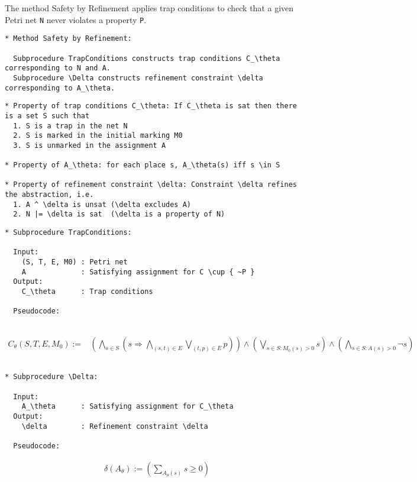 The method Safety by Refinement applies trap conditions to check that a given Petri net \verb=N= never violates a property \verb=P=.

\begin{verbatim}
* Method Safety by Refinement:

  Subprocedure TrapConditions constructs trap conditions C_\theta corresponding to N and A.
  Subprocedure \Delta constructs refinement constraint \delta corresponding to A_\theta.
\end{verbatim}




\begin{verbatim}
* Property of trap conditions C_\theta: If C_\theta is sat then there is a set S such that
  1. S is a trap in the net N
  2. S is marked in the initial marking M0
  3. S is unmarked in the assignment A

* Property of A_\theta: for each place s, A_\theta(s) iff s \in S

* Property of refinement constraint \delta: Constraint \delta refines the abstraction, i.e.
  1. A ^ \delta is unsat (\delta excludes A)
  2. N |= \delta is sat  (\delta is a property of N)
\end{verbatim}

\newpage

\begin{verbatim}
* Subprocedure TrapConditions:

  Input:
    (S, T, E, M0) : Petri net
    A             : Satisfying assignment for C \cup { ~P }
  Output:
    C_\theta      : Trap conditions

  Pseudocode:
  
\end{verbatim}
\begin{align*}
  C_\theta(S, T, E, M_0) :=& \left( \bigwedge_{s \in S} \left( s \Rightarrow
      \bigwedge_{(s, t) \in E} \bigvee_{(t, p) \in E} p
    \right) \right) \land
    \left( \bigvee_{s \in S: M_0(s) > 0} s \right) \land
    \left( \bigwedge_{s \in S: A(s) > 0} \neg s \right)
\end{align*}
\begin{verbatim}

* Subprocedure \Delta:

  Input:
    A_\theta      : Satisfying assignment for C_\theta
  Output:
    \delta        : Refinement constraint \delta

  Pseudocode:

\end{verbatim}
\begin{align*}
  & \delta(A_\theta) := \left( \sum_{A_\theta(s)} s \ge 0 \right)
\end{align*}

